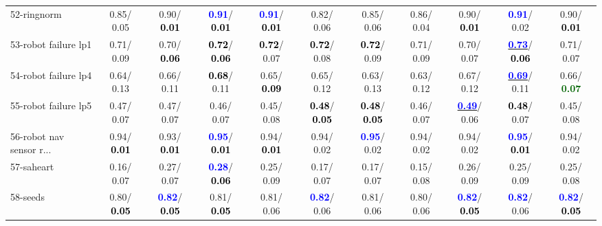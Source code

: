 \begin{table}[h]
\begin{center}
{\begin{tabular}{lc|c|c|c|c|c|c|c|c|c}
52-ringnorm &   0.85/  0.05 &   0.90/\textcolor{black}{\textbf{  0.01}} & \textcolor{blue}{\textbf{  0.91}}/\textcolor{black}{\textbf{  0.01}} & \textcolor{blue}{\textbf{  0.91}}/\textcolor{black}{\textbf{  0.01}} &   0.82/  0.06 &   0.85/  0.06 &   0.86/  0.04 &   0.90/\textcolor{black}{\textbf{  0.01}} & \textcolor{blue}{\textbf{  0.91}}/  0.02 &   0.90/\textcolor{black}{\textbf{  0.01}} \\
53-robot failure lp1 &   0.71/  0.09 &   0.70/\textcolor{black}{\textbf{  0.06}} & \textcolor{black}{\textbf{  0.72}}/\textcolor{black}{\textbf{  0.06}} & \textcolor{black}{\textbf{  0.72}}/  0.07 & \textcolor{black}{\textbf{  0.72}}/  0.08 & \textcolor{black}{\textbf{  0.72}}/  0.09 &   0.71/  0.09 &   0.70/  0.07 & \underline{\textcolor{blue}{\textbf{  0.73}}}/\textcolor{black}{\textbf{  0.06}} &   0.71/  0.07 \\ \hline
54-robot failure lp4 &   0.64/  0.13 &   0.66/  0.11 & \textcolor{black}{\textbf{  0.68}}/  0.11 &   0.65/\textcolor{black}{\textbf{  0.09}} &   0.65/  0.12 &   0.63/  0.13 &   0.63/  0.12 &   0.67/  0.12 & \underline{\textcolor{blue}{\textbf{  0.69}}}/  0.11 &   0.66/\textcolor{darkgreen}{\textbf{  0.07}} \\
55-robot failure lp5 &   0.47/  0.07 &   0.47/  0.07 &   0.46/  0.07 &   0.45/  0.08 & \textcolor{black}{\textbf{  0.48}}/\textcolor{black}{\textbf{  0.05}} & \textcolor{black}{\textbf{  0.48}}/\textcolor{black}{\textbf{  0.05}} &   0.46/  0.07 & \underline{\textcolor{blue}{\textbf{  0.49}}}/  0.06 & \textcolor{black}{\textbf{  0.48}}/  0.07 &   0.45/  0.08 \\
56-robot nav sensor r... &   0.94/\textcolor{black}{\textbf{  0.01}} &   0.93/\textcolor{black}{\textbf{  0.01}} & \textcolor{blue}{\textbf{  0.95}}/\textcolor{black}{\textbf{  0.01}} &   0.94/\textcolor{black}{\textbf{  0.01}} &   0.94/  0.02 & \textcolor{blue}{\textbf{  0.95}}/  0.02 &   0.94/  0.02 &   0.94/  0.02 & \textcolor{blue}{\textbf{  0.95}}/\textcolor{black}{\textbf{  0.01}} &   0.94/  0.02 \\
57-saheart &   0.16/  0.07 &   0.27/  0.07 & \textcolor{blue}{\textbf{  0.28}}/\textcolor{black}{\textbf{  0.06}} &   0.25/  0.09 &   0.17/  0.07 &   0.17/  0.07 &   0.15/  0.08 &   0.26/  0.09 &   0.25/  0.09 &   0.25/  0.08 \\
58-seeds &   0.80/\textcolor{black}{\textbf{  0.05}} & \textcolor{blue}{\textbf{  0.82}}/\textcolor{black}{\textbf{  0.05}} &   0.81/\textcolor{black}{\textbf{  0.05}} &   0.81/  0.06 & \textcolor{blue}{\textbf{  0.82}}/  0.06 &   0.81/  0.06 &   0.80/  0.06 & \textcolor{blue}{\textbf{  0.82}}/\textcolor{black}{\textbf{  0.05}} & \textcolor{blue}{\textbf{  0.82}}/  0.06 & \textcolor{blue}{\textbf{  0.82}}/\textcolor{black}{\textbf{  0.05}} \\

\end{tabular}}
\end{center}
\end{table}
